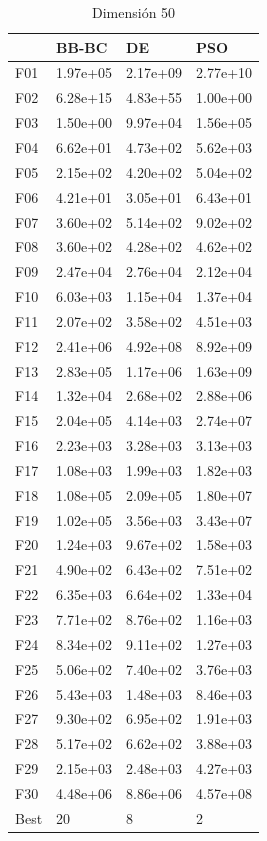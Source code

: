 \begin{table}[H]
    \begin{minipage}{.5\linewidth}
      \caption{Dimensión 50}
      \centering
      \begin{tabular}{llll}
        \toprule
        {} &     BB-BC &        DE &       PSO \\
        \midrule
        F01  &  1.97e+05 &  2.17e+09 &  2.77e+10 \\
        F02  &  6.28e+15 &  4.83e+55 &  1.00e+00 \\
        F03  &  1.50e+00 &  9.97e+04 &  1.56e+05 \\
        F04  &  6.62e+01 &  4.73e+02 &  5.62e+03 \\
        F05  &  2.15e+02 &  4.20e+02 &  5.04e+02 \\
        F06  &  4.21e+01 &  3.05e+01 &  6.43e+01 \\
        F07  &  3.60e+02 &  5.14e+02 &  9.02e+02 \\
        F08  &  3.60e+02 &  4.28e+02 &  4.62e+02 \\
        F09  &  2.47e+04 &  2.76e+04 &  2.12e+04 \\
        F10  &  6.03e+03 &  1.15e+04 &  1.37e+04 \\
        F11  &  2.07e+02 &  3.58e+02 &  4.51e+03 \\
        F12  &  2.41e+06 &  4.92e+08 &  8.92e+09 \\
        F13  &  2.83e+05 &  1.17e+06 &  1.63e+09 \\
        F14  &  1.32e+04 &  2.68e+02 &  2.88e+06 \\
        F15  &  2.04e+05 &  4.14e+03 &  2.74e+07 \\
        F16  &  2.23e+03 &  3.28e+03 &  3.13e+03 \\
        F17  &  1.08e+03 &  1.99e+03 &  1.82e+03 \\
        F18  &  1.08e+05 &  2.09e+05 &  1.80e+07 \\
        F19  &  1.02e+05 &  3.56e+03 &  3.43e+07 \\
        F20  &  1.24e+03 &  9.67e+02 &  1.58e+03 \\
        F21  &  4.90e+02 &  6.43e+02 &  7.51e+02 \\
        F22  &  6.35e+03 &  6.64e+02 &  1.33e+04 \\
        F23  &  7.71e+02 &  8.76e+02 &  1.16e+03 \\
        F24  &  8.34e+02 &  9.11e+02 &  1.27e+03 \\
        F25  &  5.06e+02 &  7.40e+02 &  3.76e+03 \\
        F26  &  5.43e+03 &  1.48e+03 &  8.46e+03 \\
        F27  &  9.30e+02 &  6.95e+02 &  1.91e+03 \\
        F28  &  5.17e+02 &  6.62e+02 &  3.88e+03 \\
        F29  &  2.15e+03 &  2.48e+03 &  4.27e+03 \\
        F30  &  4.48e+06 &  8.86e+06 &  4.57e+08 \\
        Best &        20 &         8 &         2 \\
        \bottomrule
        \end{tabular}
        

\end{minipage}
\end{table}
